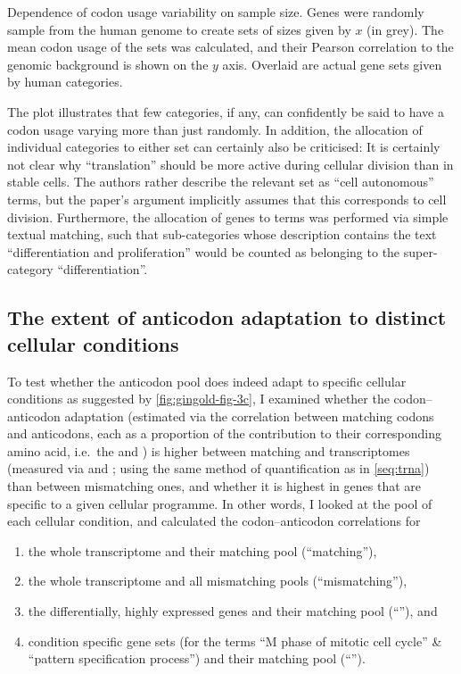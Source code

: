     {Dependence of codon usage variability on sample size.}
    {Genes were randomly sample from the human genome to create sets of sizes
    given by \(x\) (in grey). The mean codon usage of the sets was calculated,
    and their Pearson correlation to the genomic background is shown on the
    \(y\) axis. Overlaid are actual gene sets given by human \go categories.}

The plot illustrates that few \go categories, if any, can confidently be said to
have a codon usage varying more than just randomly. In addition, the allocation
of individual \go categories to either set can certainly also be criticised: It
is certainly not clear why “translation” should be more active during cellular
division than in stable cells. The authors rather describe the relevant set as
“cell autonomous” \go terms, but the paper’s argument implicitly assumes that
this corresponds to cell division. Furthermore, the allocation of genes to \go
terms was performed via simple textual matching, such that \go sub-categories
whose description contains the text “differentiation and proliferation” would be
counted as belonging to the \go super-category “differentiation”.

\subsection{The extent of anticodon adaptation to distinct cellular conditions}

To test whether the anticodon pool does indeed adapt to specific cellular
conditions as suggested by \cref{fig:gingold-fig-3c}, I examined whether the
codon--anticodon adaptation (estimated via the correlation between matching
codons and anticodons, each as a proportion of the contribution to their
corresponding amino acid, i.e.\ the \rcu and \raa) is higher between matching
\mrna and \trna transcriptomes (measured via \rnaseq and  \chipseq; using
the same method of quantification as in \cref{seq:trna}) than between
mismatching ones, and whether it is highest in genes that are specific to a
given cellular programme. In other words, I looked at the \mrna pool of each
cellular condition, and calculated the codon--anticodon correlations for

\begin{enumerate}
    \item the whole transcriptome and their matching \trna pool (“matching”),
    \item the whole transcriptome and all mismatching \trna pools
        (“mismatching”),
    \item the differentially, highly expressed \mrna genes and their matching
        \trna pool (“”), and
    \item condition specific gene sets (for the \go terms “M phase of mitotic
        cell cycle” \& “pattern specification process”) and their matching \trna
        pool (“”).
\end{enumerate}

